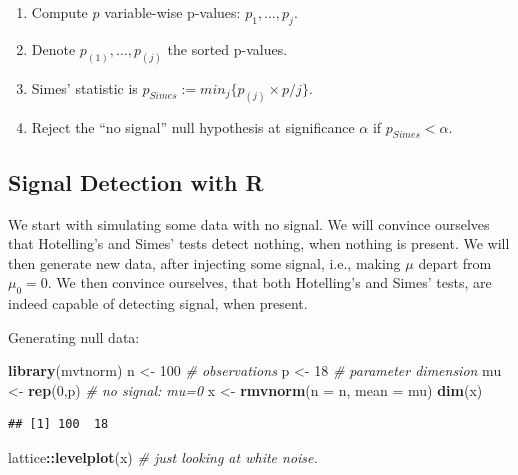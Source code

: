 \documentclass[]{book}
\newenvironment{Shaded}{\begin{snugshade}}{\end{snugshade}}
\newcommand{\CommentTok}[1]{\textcolor[rgb]{0.56,0.35,0.01}{\textit{#1}}}
\newcommand{\DataTypeTok}[1]{\textcolor[rgb]{0.13,0.29,0.53}{#1}}
\newcommand{\DecValTok}[1]{\textcolor[rgb]{0.00,0.00,0.81}{#1}}
\newcommand{\KeywordTok}[1]{\textcolor[rgb]{0.13,0.29,0.53}{\textbf{#1}}}
\newcommand{\NormalTok}[1]{#1}
\newcommand{\OperatorTok}[1]{\textcolor[rgb]{0.81,0.36,0.00}{\textbf{#1}}}
\newcommand{\StringTok}[1]{\textcolor[rgb]{0.31,0.60,0.02}{#1}}
\providecommand{\tightlist}{%
  \setlength{\itemsep}{0pt}\setlength{\parskip}{0pt}}
\theoremstyle{definition}
\theoremstyle{definition}
\theoremstyle{definition}
\theoremstyle{remark}
\begin{document}
\begin{enumerate}
\def\labelenumi{\arabic{enumi}.}
\tightlist
\item
  Compute \(p\) variable-wise p-values: \(p_1,\dots,p_j\).
\item
  Denote \(p_{(1)},\dots,p_{(j)}\) the sorted p-values.
\item
  Simes' statistic is \(p_{Simes}:=min_j\{p_{(j)} \times p/j\}\).
\item
  Reject the ``no signal'' null hypothesis at significance \(\alpha\) if \(p_{Simes}<\alpha\).
\end{enumerate}

\hypertarget{signal-detection-with-r}{%
\subsection{Signal Detection with R}\label{signal-detection-with-r}}

We start with simulating some data with no signal.
We will convince ourselves that Hotelling's and Simes' tests detect nothing, when nothing is present.
We will then generate new data, after injecting some signal, i.e., making \(\mu\) depart from \(\mu_0=0\).
We then convince ourselves, that both Hotelling's and Simes' tests, are indeed capable of detecting signal, when present.

Generating null data:

\begin{Shaded}
\begin{Highlighting}[]
\KeywordTok{library}\NormalTok{(mvtnorm)}
\NormalTok{n <-}\StringTok{ }\DecValTok{100} \CommentTok{# observations}
\NormalTok{p <-}\StringTok{ }\DecValTok{18} \CommentTok{# parameter dimension}
\NormalTok{mu <-}\StringTok{ }\KeywordTok{rep}\NormalTok{(}\DecValTok{0}\NormalTok{,p) }\CommentTok{# no signal: mu=0}
\NormalTok{x <-}\StringTok{ }\KeywordTok{rmvnorm}\NormalTok{(}\DataTypeTok{n =}\NormalTok{ n, }\DataTypeTok{mean =}\NormalTok{ mu)}
\KeywordTok{dim}\NormalTok{(x)}
\end{Highlighting}
\end{Shaded}

\begin{verbatim}
## [1] 100  18
\end{verbatim}

\begin{Shaded}
\begin{Highlighting}[]
\NormalTok{lattice}\OperatorTok{::}\KeywordTok{levelplot}\NormalTok{(x) }\CommentTok{# just looking at white noise.}
\end{Highlighting}
\end{Shaded}
\end{document}
